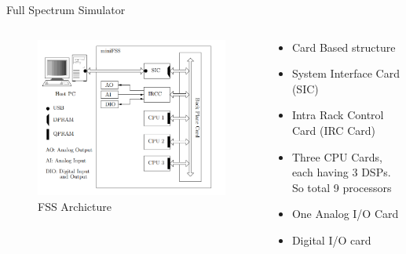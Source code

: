 \documentclass{beamer}
\begin{document}
\begin{frame}{Full Spectrum Simulator}
\begin{columns}
\begin{column}{0.5\textwidth}
\begin{figure}
\includegraphics[width=\columnwidth]{fig/fss_arch2.png}
\caption{FSS Archicture}
\end{figure}
\end{column}
\begin{column}{0.5\textwidth}
\begin{itemize}
\item Card Based structure
\item System Interface Card (SIC)
\item Intra Rack Control Card (IRC Card)
\item Three CPU Cards, each having 3 DSPs. So total 9 processors
\item One Analog I/O Card
\item Digital I/O card 
\end{itemize}
\end{column}
\end{columns}
\end{frame}   

\end{document}
